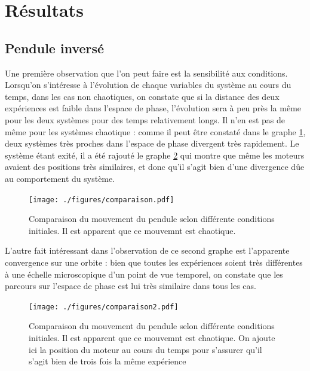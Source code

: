 \documentclass[a4paper,12pt,oneside]{article}
\begin{document}
\section{Résultats}

\subsection{Pendule inversé}

Une première observation que l'on peut faire est la sensibilité aux conditions.
Lorsqu'on s'intéresse à l'évolution de chaque variables du système au cours du temps, dans les cas non chaotiques, on constate que si la distance des deux expériences est faible dans l'espace de phase, l'évolution sera à peu près la même pour les deux systèmes pour des temps relativement longs. Il n'en est pas de même pour les systèmes chaotique : comme il peut être constaté dans le graphe \ref{fig:comparaison}, deux systèmes très proches dans l'espace de phase divergent très rapidement. Le système étant exité, il a été rajouté le graphe \ref{fig:comparaison2} qui montre que même les moteurs avaient des positions très similaires, et donc qu'il s'agit bien d'une divergence dûe au comportement du système.

 

\begin{figure}[h!]
  \begin{center}
  \texttt{[image: ./figures/comparaison.pdf]}
  \caption{Comparaison du mouvement du pendule selon différente conditions initiales. Il est apparent que ce mouvemnt est chaotique. %
  } \label{fig:comparaison}
  \end{center}
\end{figure}

L'autre fait intéressant dans l'observation de ce second graphe est l'apparente convergence sur une orbite : bien que toutes les expériences soient très différentes à une échelle microscopique d'un point de vue temporel, on constate que les parcours sur l'espace de phase est lui très similaire dans tous les cas.

\begin{figure}[h!]
  \begin{center}
  \texttt{[image: ./figures/comparaison2.pdf]}
  \caption{Comparaison du mouvement du pendule selon différente conditions initiales. Il est apparent que ce mouvemnt est chaotique. On ajoute ici la position du moteur au cours du temps pour s'assurer qu'il s'agit bien de trois fois la même expérience} \label{fig:comparaison2}
  \end{center}
\end{figure}
\end{document}
